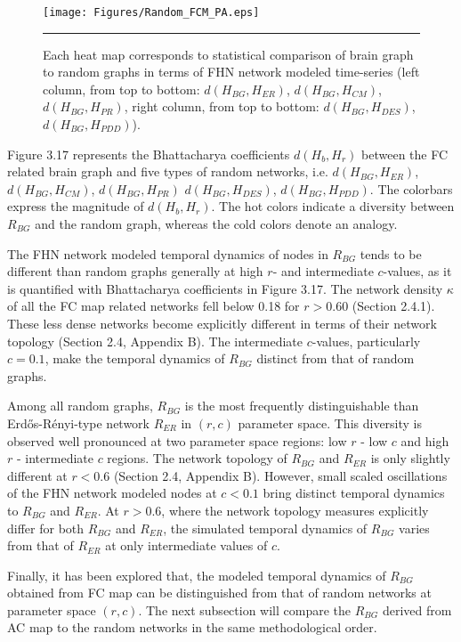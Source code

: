 \begin{figure}[htbp]
 
  \centering
	 \texttt{[image: Figures/Random\_FCM\_PA.eps]}
	 \rule{35em}{0.5pt}
  \caption[Random Graph Comparison, FCM]{Each heat map corresponds to statistical comparison of brain graph to random graphs in terms of FHN network modeled time-series (left column, from top to bottom: $d(H_{BG}, H_{ER})$, $d(H_{BG}, H_{CM})$, $d(H_{BG}, H_{PR})$, right column, from top to bottom: $d(H_{BG}, H_{DES})$, $d(H_{BG}, H_{PDD})$).  } 
    \label{fig:Random Graph Comparison, FCM}
 	
\end{figure}  


Figure 3.17 represents the Bhattacharya coefficients $d(H_b,H_r)$ between the FC related brain  graph and five types of random networks, i.e.  $d(H_{BG}, H_{ER})$, $d(H_{BG}, H_{CM})$, $d(H_{BG}, H_{PR})$ $d(H_{BG}, H_{DES})$, $d(H_{BG}, H_{PDD})$. The colorbars express the magnitude of $d(H_b,H_r)$. The hot colors indicate a diversity between $R_{BG}$ and the random graph, whereas the cold colors denote an analogy. 

The FHN network modeled temporal dynamics of nodes in $R_{BG}$ tends to be different than random graphs generally at high $r$- and intermediate $c$-values, as it is quantified with Bhattacharya coefficients in Figure 3.17. The network density $\kappa$ of all the FC map related networks fell below 0.18 for $r>0.60$ (Section 2.4.1). These less dense networks become explicitly different in terms of their network topology (Section 2.4, Appendix B). The intermediate $c$-values, particularly $c=0.1$, make the temporal dynamics of $R_{BG}$ distinct from that of random graphs.   

Among all random graphs, $R_{BG}$ is the most frequently distinguishable than Erd\H{o}s-R\'{e}nyi-type network $R_{ER}$ in $(r,c)$ parameter space. This diversity is observed well pronounced at two parameter space regions: low $r$ - low $c$ and high $r$ - intermediate $c$ regions. The network topology of $R_{BG}$ and $R_{ER}$ is only slightly different at $r<0.6$ (Section 2.4, Appendix B). However, small scaled oscillations of the FHN network modeled nodes at $c<0.1$ bring distinct temporal dynamics to  $R_{BG}$ and $R_{ER}$.  At $r>0.6$, where the  network topology measures explicitly differ for both $R_{BG}$ and $R_{ER}$, the simulated temporal dynamics of $R_{BG}$ varies from that of $R_{ER}$ at only intermediate values of $c$.

Finally, it has been explored that, the modeled temporal dynamics of $R_{BG}$ obtained from FC map can be distinguished from that of random networks at parameter space $(r,c)$. The next subsection will compare the $R_{BG}$ derived from AC map to the random networks in the same methodological order.    

